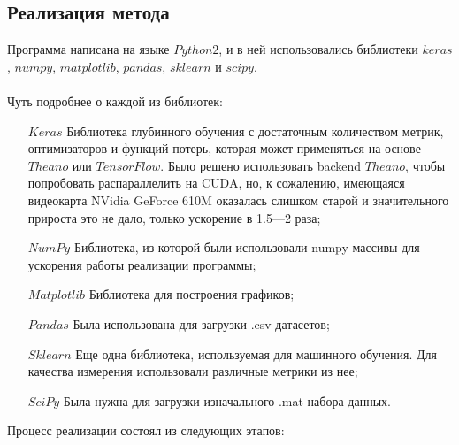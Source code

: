 \documentclass[russian,english,18pt,a4paper,reqno,dviphfm]{article}
\begin{document}
\subsection{Реализация метода}
Программа написана на языке $Python 2$, и в ней использовались библиотеки $keras$, $numpy$, $matplotlib$, $pandas$, $sklearn$ и $scipy$. \\\\
Чуть подробнее о каждой из библиотек:
\begin{itemize}
	\item[$Keras$] Библиотека глубинного обучения с достаточным количеством метрик, оптимизаторов и функций потерь, которая может применяться на основе $Theano$ или $TensorFlow$. Было решено использовать backend $Theano$, чтобы попробовать распараллелить на CUDA, но, к сожалению, имеющаяся видеокарта NVidia GeForce 610M оказалась слишком старой и значительного прироста это не дало, только ускорение в 1.5---2 раза;
	\item[$NumPy$] Библиотека, из которой были использовали numpy-массивы для ускорения работы реализации программы;
	\item[$Matplotlib$] Библиотека для построения графиков;
	\item[$Pandas$] Была использована для загрузки .csv датасетов;
	\item[$Sklearn$] Еще одна библиотека, используемая для машинного обучения. Для качества измерения использовали различные метрики из нее;
	\item[$SciPy$] Была нужна для загрузки изначального .mat набора данных.
\end{itemize}
Процесс реализации состоял из следующих этапов:
\end{document}
